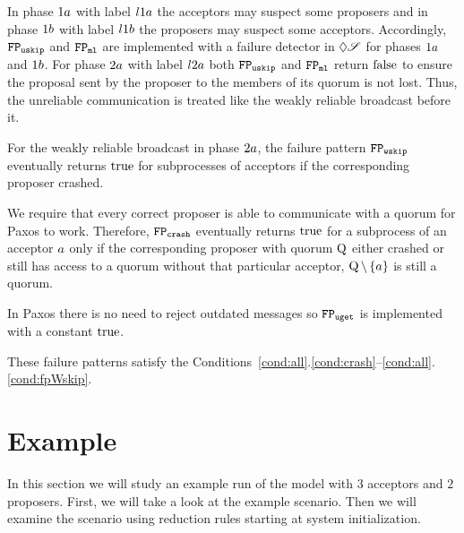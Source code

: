 In phase $1a$ with label $l1a$ the acceptors may suspect some proposers and in phase $1b$ with label $l1b$ the proposers may suspect some acceptors.
Accordingly, $\mathtt{FP_{uskip}}$ and $\mathtt{FP_{ml}}$ are implemented with a failure detector in $\Diamond\mathscr{S}$ for phases $1a$ and $1b$.
For phase $2a$ with label $l2a$ both $\mathtt{FP_{uskip}}$ and $\mathtt{FP_{ml}}$ return $\operatorname{false}$ to ensure the proposal sent by the proposer to the members of its quorum is not lost.
Thus, the unreliable communication is treated like the weakly reliable broadcast before it.

For the weakly reliable broadcast in phase $2a$, the failure pattern $\mathtt{FP_{wskip}}$ eventually returns $\operatorname{true}$ for subprocesses of acceptors if the corresponding proposer crashed.

We require that every correct proposer is able to communicate with a quorum for Paxos to work.
Therefore, $\mathtt{FP_{crash}}$ eventually returns $\operatorname{true}$ for a subprocess of an acceptor $a$ only if the corresponding proposer with quorum $\operatorname{Q}$ either crashed or still has access to a quorum without that particular acceptor, \ie $\operatorname{Q}\setminus\left\{a\right\}$ is still a quorum.

In Paxos there is no need to reject outdated messages so $\mathtt{FP_{uget}}$ is implemented with a constant $\operatorname{true}$.

These failure patterns satisfy the Conditions~\ref{cond:all}.\ref{cond:crash}--\ref{cond:all}.\ref{cond:fpWskip}.

\section{Example}
In this section we will study an example run of the model with $3$ acceptors and $2$ proposers.
First, we will take a look at the example scenario.
Then we will examine the scenario using reduction rules starting at system initialization.

